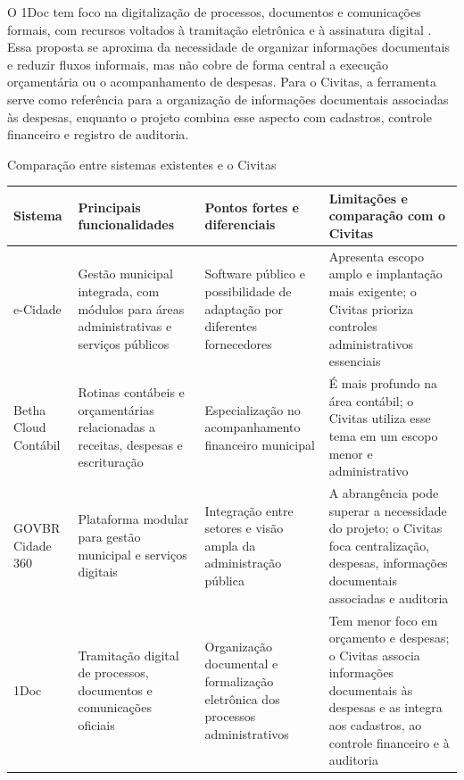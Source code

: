 O 1Doc tem foco na digitalização de processos, documentos e comunicações formais, com recursos voltados à tramitação eletrônica e à assinatura digital \parencite{OneDoc2026}. Essa proposta se aproxima da necessidade de organizar informações documentais e reduzir fluxos informais, mas não cobre de forma central a execução orçamentária ou o acompanhamento de despesas. Para o Civitas, a ferramenta serve como referência para a organização de informações documentais associadas às despesas, enquanto o projeto combina esse aspecto com cadastros, controle financeiro e registro de auditoria.

\begin{quadro}[H]
\centering
\caption{Comparação entre sistemas existentes e o Civitas}
\label{quad:comparacao_sistemas_mercado}
\small
\begin{tabularx}{\textwidth}{|P{0.16\textwidth}|X|X|X|}
\hline
\textbf{Sistema} & \textbf{Principais funcionalidades} & \textbf{Pontos fortes e diferenciais} & \textbf{Limitações e comparação com o Civitas} \\ \hline
e-Cidade & Gestão municipal integrada, com módulos para áreas administrativas e serviços públicos & Software público e possibilidade de adaptação por diferentes fornecedores & Apresenta escopo amplo e implantação mais exigente; o Civitas prioriza controles administrativos essenciais \\ \hline
Betha Cloud Contábil & Rotinas contábeis e orçamentárias relacionadas a receitas, despesas e escrituração & Especialização no acompanhamento financeiro municipal & É mais profundo na área contábil; o Civitas utiliza esse tema em um escopo menor e administrativo \\ \hline
GOVBR Cidade 360 & Plataforma modular para gestão municipal e serviços digitais & Integração entre setores e visão ampla da administração pública & A abrangência pode superar a necessidade do projeto; o Civitas foca centralização, despesas, informações documentais associadas e auditoria \\ \hline
1Doc & Tramitação digital de processos, documentos e comunicações oficiais & Organização documental e formalização eletrônica dos processos administrativos & Tem menor foco em orçamento e despesas; o Civitas associa informações documentais às despesas e as integra aos cadastros, ao controle financeiro e à auditoria \\ \hline
\end{tabularx}
\end{quadro}

